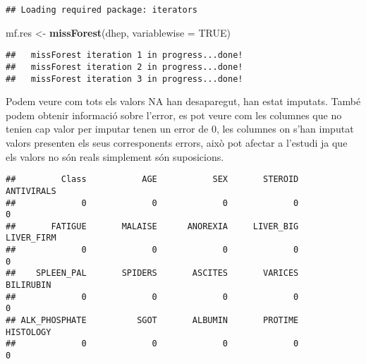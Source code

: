 \documentclass[]{article}
\newenvironment{Shaded}{\begin{snugshade}}{\end{snugshade}}
\newcommand{\DataTypeTok}[1]{\textcolor[rgb]{0.13,0.29,0.53}{#1}}
\newcommand{\KeywordTok}[1]{\textcolor[rgb]{0.13,0.29,0.53}{\textbf{#1}}}
\newcommand{\NormalTok}[1]{#1}
\newcommand{\OperatorTok}[1]{\textcolor[rgb]{0.81,0.36,0.00}{\textbf{#1}}}
\newcommand{\OtherTok}[1]{\textcolor[rgb]{0.56,0.35,0.01}{#1}}
\newcommand{\StringTok}[1]{\textcolor[rgb]{0.31,0.60,0.02}{#1}}
\begin{document}
\begin{verbatim}
## Loading required package: iterators
\end{verbatim}

\begin{Shaded}
\begin{Highlighting}[]
\NormalTok{mf.res <-}\StringTok{ }\KeywordTok{missForest}\NormalTok{(dhep, }\DataTypeTok{variablewise =} \OtherTok{TRUE}\NormalTok{)}
\end{Highlighting}
\end{Shaded}

\begin{verbatim}
##   missForest iteration 1 in progress...done!
##   missForest iteration 2 in progress...done!
##   missForest iteration 3 in progress...done!
\end{verbatim}

Podem veure com tots els valors NA han desaparegut, han estat imputats.
També podem obtenir informació sobre l'error, es pot veure com les
columnes que no tenien cap valor per imputar tenen un error de 0, les
columnes on s'han imputat valors presenten els seus corresponents
errors, això pot afectar a l'estudi ja que els valors no són reals
simplement són suposicions.

\begin{Shaded}
\end{Shaded}

\begin{verbatim}
##         Class           AGE           SEX       STEROID    ANTIVIRALS 
##             0             0             0             0             0 
##       FATIGUE       MALAISE      ANOREXIA     LIVER_BIG    LIVER_FIRM 
##             0             0             0             0             0 
##    SPLEEN_PAL       SPIDERS       ASCITES       VARICES     BILIRUBIN 
##             0             0             0             0             0 
## ALK_PHOSPHATE          SGOT       ALBUMIN       PROTIME     HISTOLOGY 
##             0             0             0             0             0
\end{verbatim}

\begin{Shaded}
\end{Shaded}
\end{document}
